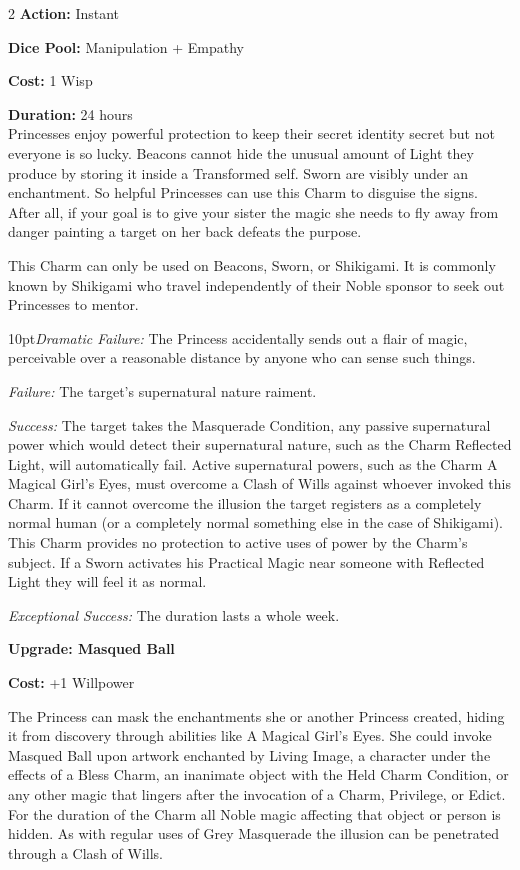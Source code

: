 \begin{multicols}{2}
\noindent \textbf{Action:} Instant

\noindent \textbf{Dice Pool:} Manipulation + Empathy

\noindent \textbf{Cost:} 1 Wisp 

\noindent \textbf{Duration:} 24 hours \\

\noindent Princesses enjoy powerful protection to keep their secret identity secret but not everyone is so lucky. Beacons cannot hide the unusual amount of Light they produce by storing it inside a Transformed self. Sworn are visibly under an enchantment. So helpful Princesses can use this Charm to disguise the signs. After all, if your goal is to give your sister the magic she needs to fly away from danger painting a target on her back defeats the purpose. 

This Charm can only be used on Beacons, Sworn, or Shikigami. It is commonly known by Shikigami who travel independently of their Noble sponsor to seek out Princesses to mentor. 

\begin{myindentpar}{10pt}\emph{Dramatic Failure:} The Princess accidentally sends out a flair of magic, perceivable over a reasonable distance by anyone who can sense such things. 

    \emph{Failure:} The target's supernatural nature raiment.

    \emph{Success:} The target takes the Masquerade Condition, any passive supernatural power which would detect their supernatural nature, such as the Charm Reflected Light, will automatically fail. Active supernatural powers, such as the Charm A Magical Girl's Eyes, must overcome a Clash of Wills against whoever invoked this Charm. If it cannot overcome the illusion the target registers as a completely normal human (or a completely normal something else in the case of Shikigami). This Charm provides no protection to active uses of power by the Charm's subject. If a Sworn activates his Practical Magic near someone with Reflected Light they will feel it as normal.

    \emph{Exceptional Success:} The duration lasts a whole week.
	
\textbf{Upgrade: Masqued Ball}

\textbf{Cost:} +1 Willpower

The Princess can mask the enchantments she or another Princess created, hiding it from discovery through abilities like A Magical Girl's Eyes. She could invoke Masqued Ball upon artwork enchanted by Living Image, a character under the effects of a Bless Charm, an inanimate object with the Held Charm Condition, or any other magic that lingers after the invocation of a Charm, Privilege, or Edict. For the duration of the Charm all Noble magic affecting that object or person is hidden. As with regular uses of Grey Masquerade the illusion can be penetrated through a Clash of Wills. 


\end{myindentpar}
\end{multicols}
